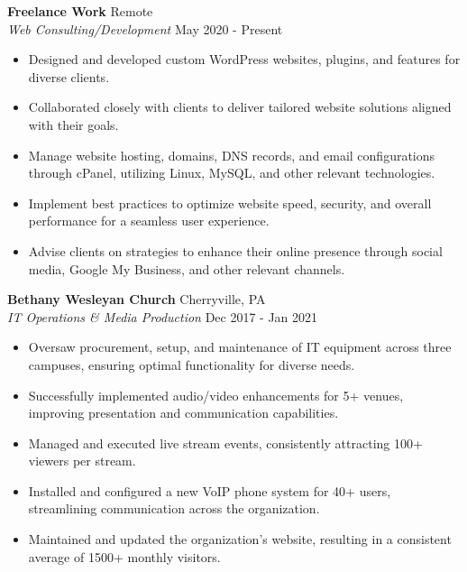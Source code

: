\documentclass[letterpaper]{article}
\begin{document}
\vspace{-1mm}
\textbf{Freelance Work} \hfill Remote \\
\textit{Web Consulting/Development} \hfill May 2020 - Present\\
\vspace{-1mm}
\begin{itemize} \itemsep -1pt
	\item Designed and developed custom WordPress websites, plugins, and features for diverse clients.
	\item Collaborated closely with clients to deliver tailored website solutions aligned with their goals.
	\item Manage website hosting, domains, DNS records, and email configurations through cPanel, utilizing Linux, MySQL, and other relevant technologies.
	\item Implement best practices to optimize website speed, security, and overall performance for a seamless user experience.
	\item Advise clients on strategies to enhance their online presence through social media, Google My Business, and other relevant channels.
\end{itemize}
\textbf{Bethany Wesleyan Church} \hfill Cherryville, PA\\
\textit{IT Operations \& Media Production} \hfill Dec 2017 - Jan 2021\\
\vspace{-1mm}
\begin{itemize} \itemsep -1pt
	\item Oversaw procurement, setup, and maintenance of IT equipment across three campuses, ensuring optimal functionality for diverse needs.
	\item Successfully implemented audio/video enhancements for 5+ venues, improving presentation and communication capabilities.
	\item Managed and executed live stream events, consistently attracting 100+ viewers per stream.
    \item Installed and configured a new VoIP phone system for 40+ users, streamlining communication across the organization.
    \item Maintained and updated the organization's website, resulting in a consistent average of 1500+ monthly visitors.
\end{itemize}
\end{document}

